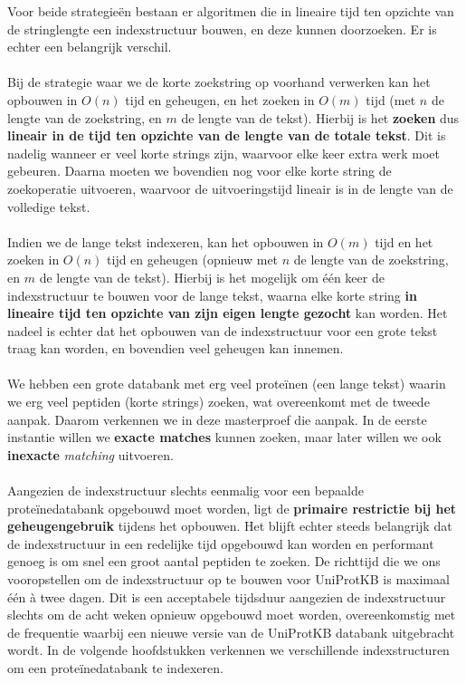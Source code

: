 Voor beide strategieën bestaan er algoritmen die in lineaire tijd ten opzichte van de stringlengte een indexstructuur bouwen, en deze kunnen doorzoeken.
Er is echter een belangrijk verschil.
\\ \\
Bij de strategie waar we de korte zoekstring op voorhand verwerken kan het opbouwen in $O(n)$ tijd en geheugen, en het zoeken in $O(m)$ tijd (met $n$ de lengte van de zoekstring, en $m$ de lengte van de tekst).
Hierbij is het \textbf{zoeken} dus \textbf{lineair in de tijd ten opzichte van de lengte van de totale tekst}.
Dit is nadelig wanneer er veel korte strings zijn, waarvoor elke keer extra werk moet gebeuren.
Daarna moeten we bovendien nog voor elke korte string de zoekoperatie uitvoeren, waarvoor de uitvoeringstijd lineair is in de lengte van de volledige tekst.
\\ \\
Indien we de lange tekst indexeren, kan het opbouwen in $O(m)$ tijd en het zoeken in $O(n)$ tijd en geheugen (opnieuw met $n$ de lengte van de zoekstring, en $m$ de lengte van de tekst).
Hierbij is het mogelijk om één keer de indexstructuur te bouwen voor de lange tekst, waarna elke korte string \textbf{in lineaire tijd ten opzichte van zijn eigen lengte gezocht} kan worden.
Het nadeel is echter dat het opbouwen van de indexstructuur voor een grote tekst traag kan worden, en bovendien veel geheugen kan innemen.
\\ \\
We hebben een grote databank met erg veel proteïnen (een lange tekst) waarin we erg veel peptiden (korte strings) zoeken, wat overeenkomt met de tweede aanpak.
Daarom verkennen we in deze masterproef die aanpak.
In de eerste instantie willen we \textbf{exacte matches} kunnen zoeken, maar later willen we ook \textbf{inexacte} \textit{matching} uitvoeren.
\\ \\
Aangezien de indexstructuur slechts eenmalig voor een bepaalde proteïnedatabank opgebouwd moet worden, ligt de \textbf{primaire restrictie bij het geheugengebruik} tijdens het opbouwen.
Het blijft echter steeds belangrijk dat de indexstructuur in een redelijke tijd opgebouwd kan worden en performant genoeg is om snel een groot aantal peptiden te zoeken.
De richttijd die we ons vooropstellen om de indexstructuur op te bouwen voor UniProtKB is maximaal één à twee dagen.
Dit is een acceptabele tijdsduur aangezien de indexstructuur slechts om de acht weken opnieuw opgebouwd moet worden, overeenkomstig met de frequentie waarbij een nieuwe versie van de UniProtKB databank uitgebracht wordt.
In de volgende hoofdstukken verkennen we verschillende indexstructuren om een proteïnedatabank te indexeren.